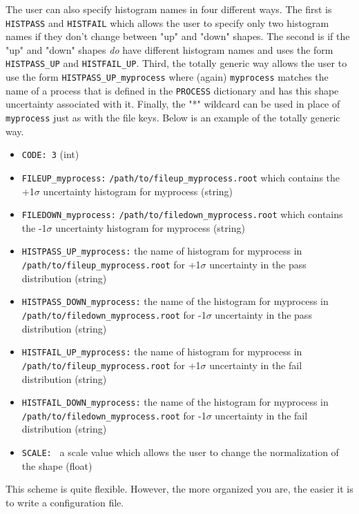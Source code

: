 \documentclass[letter]{article}
\begin{document}
\begin{itemize}
                The user can also specify histogram names in four different ways. The first is \verb"HISTPASS" and \verb"HISTFAIL" which allows the user to specify only two histogram names if they don't change between "up" and "down" shapes. The second is if the "up" and "down" shapes \textit{do} have different histogram names and uses the form \verb"HISTPASS_UP" and \verb"HISTFAIL_UP". Third, the totally generic way allows the user to use the form \verb"HISTPASS_UP_myprocess" where (again) \verb"myprocess" matches the name of a process that is defined in the \verb"PROCESS" dictionary and has this shape uncertainty associated with it. Finally, the "*" wildcard can be used in place of \verb"myprocess" just as with the file keys. Below is an example of the totally generic way.
                \begin{itemize}
                    \item \verb"CODE: 3" (int)
                    \item \verb"FILEUP_myprocess:" \verb"/path/to/fileup_myprocess.root" which contains the +1$\sigma$ uncertainty histogram for myprocess (string)
                    \item \verb"FILEDOWN_myprocess:" \verb"/path/to/filedown_myprocess.root" which contains the -1$\sigma$ uncertainty histogram for myprocess (string)
                    \item \verb"HISTPASS_UP_myprocess:" the name of histogram for myprocess in \verb"/path/to/fileup_myprocess.root" for +1$\sigma$ uncertainty in the pass distribution (string)
                    \item \verb"HISTPASS_DOWN_myprocess:" the name of the histogram for myprocess in \verb"/path/to/filedown_myprocess.root" for -1$\sigma$ uncertainty in the pass distribution (string)
                    \item \verb"HISTFAIL_UP_myprocess:" the name of histogram for myprocess in \verb"/path/to/fileup_myprocess.root" for +1$\sigma$ uncertainty in the fail distribution (string)
                    \item \verb"HISTFAIL_DOWN_myprocess:" the name of the histogram for myprocess in \verb"/path/to/filedown_myprocess.root" for -1$\sigma$ uncertainty in the fail distribution (string)
                    \item \verb"SCALE: " a scale value which allows the user to change the normalization of the shape (float)
                \end{itemize}
            \end{itemize}
            This scheme is quite flexible. However, the more organized you are, the easier it is to write a configuration file.
\end{document}
